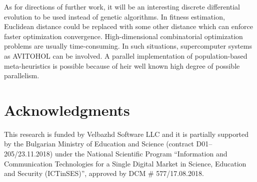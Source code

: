 \documentclass[11pt]{article}
\begin{document}
As for directions of further work, it will be an interesting discrete differential evolution to be used instead of genetic algorithms. In fitness estimation, Euclidean distance could be replaced with some other distance which can enforce faster optimization convergence. High-dimensional combinatorial optimization problems are usually time-consuming. In such situations, supercomputer systems as AVITOHOL \cite{Tashev-Tasheva-Petrov-2019} can be involved. A parallel implementation of population-based meta-heuristics is possible because of heir well known high degree of possible parallelism.

\section*{Acknowledgments}

This research is funded by Velbazhd Software LLC and it is partially supported by the Bulgarian Ministry of Education and Science (contract D01–205/23.11.2018) under the National Scientific Program ``Information and Communication Technologies for a Single Digital Market in Science, Education and Security (ICTinSES)'', approved by DCM \# 577/17.08.2018.
\end{document}
